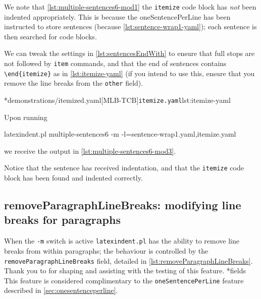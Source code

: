 

	We note that \cref{lst:multiple-sentences6-mod1} the \texttt{itemize} code block has
	\emph{not} been indented appropriately. This is because the
	oneSentencePerLine has been instructed to store sentences (because
	\cref{lst:sentence-wrap1-yaml}); each sentence is then searched for code blocks.

	We can tweak the settings in \vref{lst:sentencesEndWith} to ensure that full stops are
	not followed by \texttt{item} commands, and that the end of sentences
	contains \lstinline!\end{itemize}! as in \cref{lst:itemize-yaml} (if you intend to use this, ensure that you
	remove the line breaks from the \texttt{other} field).

	\cmhlistingsfromfile[style=yaml-LST]*{demonstrations/itemized.yaml}[MLB-TCB]{\texttt{itemize.yaml}}{lst:itemize-yaml}

	Upon running
	\begin{commandshell}
latexindent.pl multiple-sentences6 -m -l=sentence-wrap1.yaml,itemize.yaml
\end{commandshell}
	we receive the output in \cref{lst:multiple-sentences6-mod3}.


	Notice that the sentence has received indentation, and that the
	\texttt{itemize} code block has been found and indented correctly.

\subsection{removeParagraphLineBreaks: modifying line breaks for paragraphs}\label{subsec:removeparagraphlinebreaks}
	When the \texttt{-m} switch is active \texttt{latexindent.pl} has the
	ability to remove line breaks%
	 from within paragraphs; the behaviour is controlled by the
	\texttt{removeParagraphLineBreaks} field, detailed in \cref{lst:removeParagraphLineBreaks}. Thank you to
	\cite{jowens} for shaping and assisting with the testing of this feature.
*{fields}
	This feature is considered complimentary to the \texttt{oneSentencePerLine} feature
	described in \vref{sec:onesentenceperline}.

